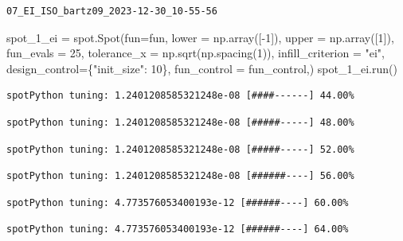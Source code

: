 \documentclass[
  letterpaper,
  DIV=11,
  numbers=noendperiod]{scrreprt}
\newenvironment{Shaded}{\begin{snugshade}}{\end{snugshade}}
\newcommand{\DecValTok}[1]{\textcolor[rgb]{0.68,0.00,0.00}{#1}}
\newcommand{\NormalTok}[1]{\textcolor[rgb]{0.00,0.23,0.31}{#1}}
\newcommand{\OperatorTok}[1]{\textcolor[rgb]{0.37,0.37,0.37}{#1}}
\newcommand{\StringTok}[1]{\textcolor[rgb]{0.13,0.47,0.30}{#1}}
\begin{document}
\begin{verbatim}
07_EI_ISO_bartz09_2023-12-30_10-55-56
\end{verbatim}

\begin{Shaded}
\begin{Highlighting}[]
\NormalTok{spot\_1\_ei }\OperatorTok{=}\NormalTok{ spot.Spot(fun}\OperatorTok{=}\NormalTok{fun,}
\NormalTok{                   lower }\OperatorTok{=}\NormalTok{ np.array([}\OperatorTok{{-}}\DecValTok{1}\NormalTok{]),}
\NormalTok{                   upper }\OperatorTok{=}\NormalTok{ np.array([}\DecValTok{1}\NormalTok{]),}
\NormalTok{                   fun\_evals }\OperatorTok{=} \DecValTok{25}\NormalTok{,}
\NormalTok{                   tolerance\_x }\OperatorTok{=}\NormalTok{ np.sqrt(np.spacing(}\DecValTok{1}\NormalTok{)),}
\NormalTok{                   infill\_criterion }\OperatorTok{=} \StringTok{"ei"}\NormalTok{,}
\NormalTok{                   design\_control}\OperatorTok{=}\NormalTok{\{}\StringTok{"init\_size"}\NormalTok{: }\DecValTok{10}\NormalTok{\},}
\NormalTok{                   fun\_control }\OperatorTok{=}\NormalTok{ fun\_control,)}
\NormalTok{spot\_1\_ei.run()}
\end{Highlighting}
\end{Shaded}

\begin{verbatim}
spotPython tuning: 1.2401208585321248e-08 [####------] 44.00% 
\end{verbatim}

\begin{verbatim}
spotPython tuning: 1.2401208585321248e-08 [#####-----] 48.00% 
\end{verbatim}

\begin{verbatim}
spotPython tuning: 1.2401208585321248e-08 [#####-----] 52.00% 
\end{verbatim}

\begin{verbatim}
spotPython tuning: 1.2401208585321248e-08 [######----] 56.00% 
\end{verbatim}

\begin{verbatim}
spotPython tuning: 4.773576053400193e-12 [######----] 60.00% 
\end{verbatim}

\begin{verbatim}
spotPython tuning: 4.773576053400193e-12 [######----] 64.00% 
\end{verbatim}
\end{document}
